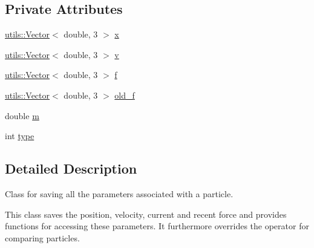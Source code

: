 \subsection*{Private Attributes}
\begin{DoxyCompactItemize}
\item 
\hyperlink{classutils_1_1Vector}{utils\-::\-Vector}$<$ double, 3 $>$ \hyperlink{classParticle_a3789900d6fe19a75d3a82cd5e9622c4c}{x}
\item 
\hyperlink{classutils_1_1Vector}{utils\-::\-Vector}$<$ double, 3 $>$ \hyperlink{classParticle_ac3669e50d83d8608d522965b9acd1d8b}{v}
\item 
\hyperlink{classutils_1_1Vector}{utils\-::\-Vector}$<$ double, 3 $>$ \hyperlink{classParticle_ad9aa3e171ea950b2cff1b4825e67845b}{f}
\item 
\hyperlink{classutils_1_1Vector}{utils\-::\-Vector}$<$ double, 3 $>$ \hyperlink{classParticle_ad9281e33474f23f7261f28848affc4a4}{old\-\_\-f}
\item 
double \hyperlink{classParticle_aedcc7e1bc53b0e2b1a4a07c9a1b47563}{m}
\item 
int \hyperlink{classParticle_a2b73dd42bcd56ba2e7ffeb0a5515a866}{type}
\end{DoxyCompactItemize}


\subsection{Detailed Description}
Class for saving all the parameters associated with a particle. 

This class saves the position, velocity, current and recent force and provides functions for accessing these parameters. It furthermore overrides the operator for comparing particles. 

